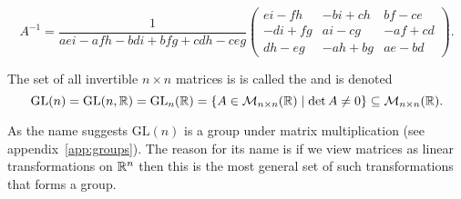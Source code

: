 \documentclass[a4paper]{article}
\newcommand{\nxmMatrices}[3]{\mathcal{M}_{{#1}\times{#2}}({#3})}
\newcommand{\generalLinearGroup}{\mathrm{GL}}
\begin{document}
    \[
        A^{-1} =
        \frac{1}{a e i - a f h - b d i + b f g + c d h - c e g}
        \begin{pmatrix}
            e i - f h & - b i + c h & b f - c e\\
            - d i + f g & a i - c g & - a f + c d\\
            d h - e g & - a h + b g & a e - b d
        \end{pmatrix}
        .
    \]
    \begin{notation*}{}
        The set of all invertible \(n\times n\) matrices is is called the  and is denoted
        \[\generalLinearGroup(n) = \generalLinearGroup(n, \reals) = \generalLinearGroup_n(\reals) = \{A\in\nxmMatrices{n}{n}{\reals}\mid \det A \ne 0\} \subseteq \nxmMatrices{n}{n}{\reals}.\]
    \end{notation*}
    As the name suggests \(\generalLinearGroup(n)\) is a group under matrix multiplication (see appendix~\ref{app:groups}).
    The reason for its name is if we view matrices as linear transformations on \(\mathbb{R}^n\) then this is the most general set of such transformations that forms a group.
    
\end{document}
